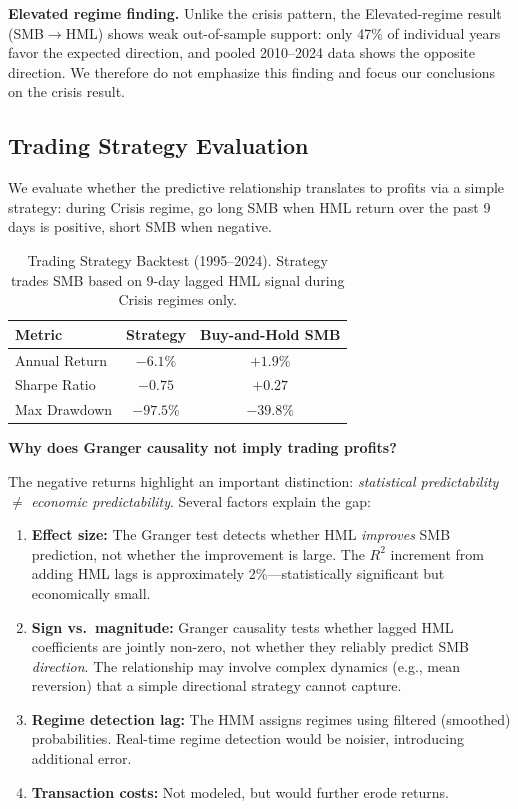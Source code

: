 \documentclass[sigconf]{acmart}
\begin{document}
\textbf{Elevated regime finding.} Unlike the crisis pattern, the Elevated-regime
result (SMB$\to$HML) shows weak out-of-sample support: only 47\% of individual years
favor the expected direction, and pooled 2010--2024 data shows the opposite direction.
We therefore do not emphasize this finding and focus our conclusions on the crisis result.

\subsection{Trading Strategy Evaluation}
\label{sec:trading}

We evaluate whether the predictive relationship translates to profits via a simple
strategy: during Crisis regime, go long SMB when HML return over the past 9 days
is positive, short SMB when negative.

\begin{table}[t]
\centering
\caption{Trading Strategy Backtest (1995--2024). Strategy trades SMB based on
9-day lagged HML signal during Crisis regimes only.}
\label{tab:trading}
\begin{tabular}{lcc}
\toprule
Metric & Strategy & Buy-and-Hold SMB \\
\midrule
Annual Return & $-6.1\%$ & $+1.9\%$ \\
Sharpe Ratio & $-0.75$ & $+0.27$ \\
Max Drawdown & $-97.5\%$ & $-39.8\%$ \\
\bottomrule
\end{tabular}
\end{table}

\textbf{Why does Granger causality not imply trading profits?}

The negative returns highlight an important distinction: \emph{statistical predictability}
$\neq$ \emph{economic predictability}. Several factors explain the gap:

\begin{enumerate}
    \item \textbf{Effect size:} The Granger test detects whether HML \emph{improves}
    SMB prediction, not whether the improvement is large. The $R^2$ increment from
    adding HML lags is approximately 2\%---statistically significant but economically small.

    \item \textbf{Sign vs.\ magnitude:} Granger causality tests whether lagged HML
    coefficients are jointly non-zero, not whether they reliably predict SMB \emph{direction}.
    The relationship may involve complex dynamics (e.g., mean reversion) that a simple
    directional strategy cannot capture.

    \item \textbf{Regime detection lag:} The HMM assigns regimes using filtered
    (smoothed) probabilities. Real-time regime detection would be noisier, introducing
    additional error.

    \item \textbf{Transaction costs:} Not modeled, but would further erode returns.
\end{enumerate}
\end{document}

